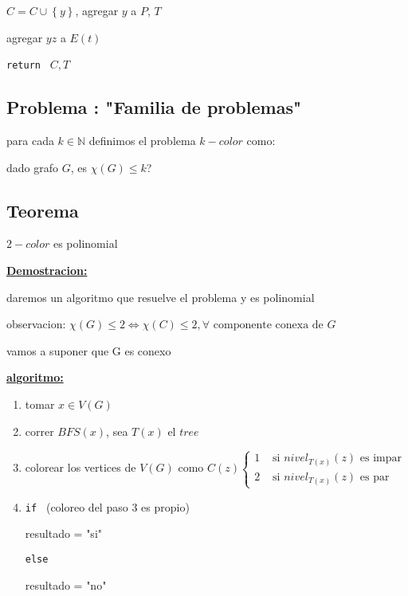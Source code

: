 \documentclass[12pt]{article}
\begin{document}
\hspace{1em}$C = C \cup \left\{y\right\}$, agregar $y$ a $P$, $T$

\hspace{1em}agregar $yz$ a $E(t)$

\texttt{return } $C, T$ \bigskip

\subsection*{Problema : "Familia de problemas"}

para cada $k \in \mathbb{N}$ definimos el problema $k-color$ 
como:\bigskip

dado grafo $G$, es $\chi(G) \leq k$? \bigskip

\begin{center}
\subsection*{Teorema}
$2-color$ es polinomial
\end{center}

\underline{\textbf{Demostracion:}}

daremos un algoritmo que resuelve el problema y es polinomial

observacion: \(\chi(G) \leq 2 \iff \chi(C) \leq 2,  \forall \text{ componente conexa de } G\)

vamos a suponer que G es conexo

\underline{\textbf{algoritmo:}}
\begin{enumerate}
\item tomar $x \in V(G)$
\item correr $BFS(x)$, sea $T(x)$ el $tree$
\item colorear los vertices de $V(G)$ como \(C(z) \begin{cases} 1 & \text{ si } nivel_{T(x)}(z)\text{ es impar} \\ 2 & \text{ si } nivel_{T(x)}(z) \text{ es par} \end{cases}\)
\item \texttt{if } (coloreo del paso 3 es propio)

\hspace{1em}resultado = "si"

\texttt{else}

\hspace{1em}resultado = "no"

\end{enumerate}\bigskip
\end{document}
